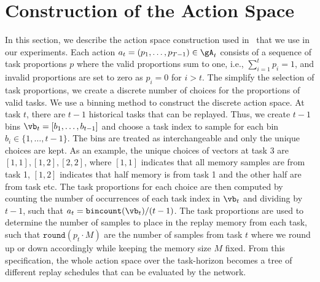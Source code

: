 
\section{Construction of the Action Space}\label{app:construction_of_the_action_space}

In this section, we describe the action space construction used in~\cite{klasson2021learn} that we use in our experiments. Each action $a_t = (p_1, \dots, p_{T-1}) \in \gA_t$ consists of a sequence of task proportions $p$ where the valid proportions sum to one, i.e., $\sum_{i=1}^{t} p_i = 1$, and invalid proportions are set to zero as $p_i = 0$ for $i>t$. The simplify the selection of task proportions, we create a discrete number of choices for the proportions of valid tasks. We use a binning method to construct the discrete action space. At task $t$, there are $t-1$ historical tasks that can be replayed. Thus, we create $t-1$ bins $\vb_t = [b_1, \dots, b_{t-1}]$ and choose a task index to sample for each bin $b_i \in \{1, \dots, t-1 \}$. The bins are treated as interchangeable and only the unique choices are kept. As an example, the unique choices of vectors at task 3 are $[1,1], [1,2], [2,2]$, where $[1,1]$ indicates that all memory samples are from task 1, $[1,2]$ indicates that half memory is from task 1 and the other half are from task etc. The task proportions for each choice are then computed by counting the number of occurrences of each task index in $\vb_t$ and dividing by $t-1$, such that $a_t = \texttt{bincount}(\vb_t) / (t-1)$. The task proportions are used to determine the number of samples to place in the replay memory from each task, such that $\texttt{round}(p_t \cdot M)$ are the number of samples from task $t$ where we round up or down accordingly while keeping the memory size $M$ fixed. From this specification, the whole action space over the task-horizon becomes a tree of different replay schedules that can be evaluated by the network.
